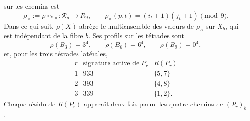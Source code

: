 sur les chemins est
\begin{equation}
 \rho_\times:=\rho\circ\pi_\times:\mathcal R_a\longrightarrow R_9,
 \qquad
 \rho_\times(p,t)=(i_t+1)(j_t+1)\pmod9.
 \label{eq:residuo-producto-rutas-fano-semillas-rev3}
\end{equation}
Dans ce qui suit, \(\rho(X)\) abrège le multiensemble des valeurs de
\(\rho_\times\) sur \(X_b\), qui est indépendant de la fibre \(b\). Ses
profils sur les tétrades sont
\[
 \rho(B_3)=3^4,
 \qquad
 \rho(B_6)=6^4,
 \qquad
 \rho(B_9)=0^4,
\]
et, pour les trois tétrades latérales,
\begin{equation}
 \begin{array}{c|c|c}
 r&\text{signature active de }P_r&R(P_r)\\
 \hline
 1&933&\{5,7\}\\
 2&393&\{4,8\}\\
 3&339&\{1,2\}.
 \end{array}
 \label{eq:perfiles-laterales-fano-semillas-rev3}
\end{equation}
Chaque résidu de \(R(P_r)\) apparaît deux fois parmi les quatre chemins de
\((P_r)_b\).

